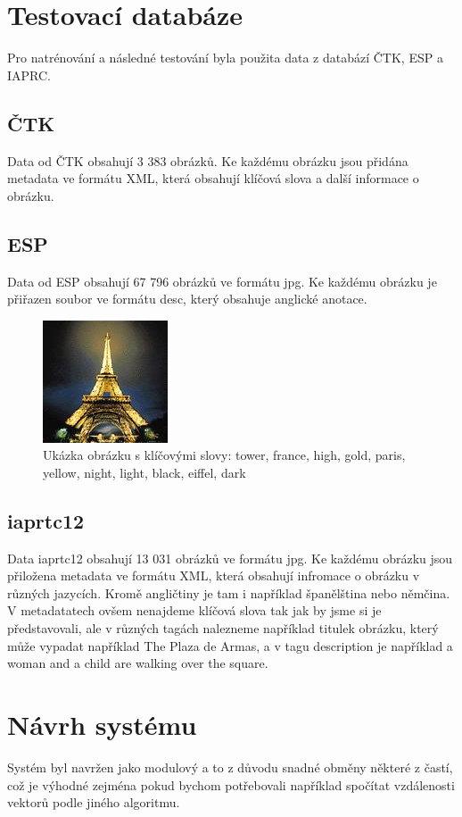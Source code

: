 \documentclass[czech,BP]{thesiskiv}
\begin{document}
\chapter{Testovací databáze}
Pro natrénování a následné testování byla použita data z databází ČTK, ESP a IAPRC.

\section{ČTK}
Data od ČTK obsahují 3 383 obrázků. Ke každému obrázku jsou přidána metadata ve formátu XML, která obsahují klíčová slova a další informace o obrázku. 

\section{ESP}
Data od ESP obsahují 67 796 obrázků ve formátu jpg. Ke každému obrázku je přiřazen soubor ve formátu desc, který obsahuje anglické anotace.

\begin{figure}[h]
		\centering
		\includegraphics[width=140px]{./img/ESP.jpg}	
		\caption{Ukázka obrázku s klíčovými slovy: tower, france, high, gold, paris, yellow, night, light, black, eiffel, dark}
\end{figure}

\section{iaprtc12}
Data iaprtc12 obsahují 13 031 obrázků ve formátu jpg. Ke každému obrázku jsou přiložena metadata ve formátu XML, která obsahují 
infromace o obrázku v různých jazycích. Kromě angličtiny je tam i například španělština nebo němčina. V metadatatech ovšem nenajdeme klíčová slova tak jak by jsme si je představovali, ale v různých tagách nalezneme například titulek obrázku, který může vypadat například The Plaza de Armas, a v tagu description je například  a woman and a child are walking over the square.


\chapter{Návrh systému}
Systém byl navržen jako modulový a to z důvodu snadné obměny některé z častí, což je výhodné zejména pokud bychom potřebovali například spočítat vzdálenosti vektorů podle jiného algoritmu. 
\end{document}
